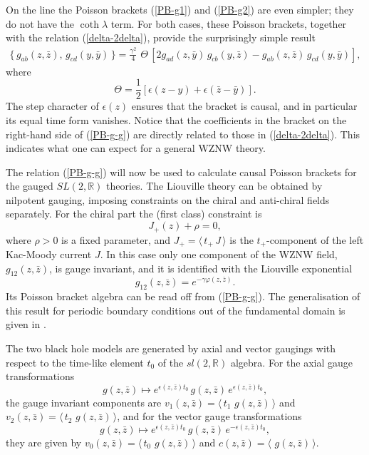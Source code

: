 \documentclass[a4paper,12pt]{article}
\newcommand{\rr}{\mathbb{R}}
\begin{document}
On the line the Poisson brackets (\ref{PB-g1}) and (\ref{PB-g2}) are
even simpler; they do not have the $\coth \lambda$ term.
 For both cases, these Poisson brackets,
together with the relation (\ref{delta-2delta}), provide
 the surprisingly simple result
\begin{eqnarray}\label{PB-g-g}
\{\,g_{ab}(z,\bar z),\, g_{cd}(y,\bar y)\,\}=\frac{\gamma^2}{4}\,
\,\Theta\,
[2 g_{ad}(z,\bar y)\,g_{cb}(y,\bar z)-
g_{ab}(z,\bar z)\,g_{cd}(y,\bar y)],
\end{eqnarray}
where
\begin{equation}\label{Theta}
\Theta =\frac{1}{2}[\epsilon(z-y)+\epsilon(\bar z-\bar y)].
\end{equation}
The step character of  $\epsilon(z)$ ensures that the bracket is causal,
 and in particular its equal time form vanishes.
 Notice that the coefficients in the
bracket on the right-hand side of (\ref{PB-g-g}) are directly related to
those in (\ref{delta-2delta}). This indicates what one can expect
for a general WZNW theory.


The relation (\ref{PB-g-g}) will now be used to calculate
causal Poisson brackets for the gauged $SL(2,\rr)$ theories. The
Liouville theory can be obtained by nilpotent gauging, imposing
constraints on the chiral and anti-chiral fields separately. For the
chiral part the (first class)
constraint is
\begin{equation}\label{constraint}
J_+(z)+\rho =0,
\end{equation}
where $\rho > 0$ is a fixed parameter, and  $J_+=\langle\, t_+\,J\,\rangle$
is the $t_+$-component of the left  Kac-Moody current $J$.
In this case only one component of the WZNW field, $g_{12}(z,\bar z)$,
is gauge invariant, and it
is identified with the Liouville exponential
\cite{BFFOW, JW}
\begin{equation}\label{varphi}
g_{12}(z,\bar z)=
e^{-\gamma \varphi(z, \bar z)}.
\end{equation}
Its Poisson bracket algebra can be read off from
 (\ref{PB-g-g}).
The generalisation of this result for periodic boundary conditions
out of the fundamental domain is given in \cite{JW}.


The two black hole models \cite{BCR, FJW} are generated by axial and
vector gaugings with respect to the time-like element $t_0$
of the $sl(2,\rr)$ algebra. For the
axial gauge transformations
\begin{equation}\label{axial}
g(z,\bar z)\mapsto e^{\epsilon(z,\bar z)t_0}\,g(z,\bar z)\,
e^{\epsilon(z,\bar z)t_0},
\end{equation}
the gauge invariant components are $v_1(z,\bar z)
=\langle\, t_1\,\,g(z,\bar z)\,\rangle$
and $v_2(z,\bar z)=\langle\, t_2\,\,g(z,\bar z)
\,\rangle$, and for the vector gauge
transformations
\begin{equation}\label{vector}
g(z,\bar z)\mapsto e^{\epsilon(z,\bar z)t_0}\,g(z,\bar z)\,
e^{-\epsilon(z,\bar z)t_0},
\end{equation}
they are given by $v_0(z,\bar z)=\langle\, t_0\,\,g(z,\bar z)
\,\rangle$ and $c(z,\bar z)=\langle \,\,g(z,\bar z)\,\rangle$.
\end{document}
